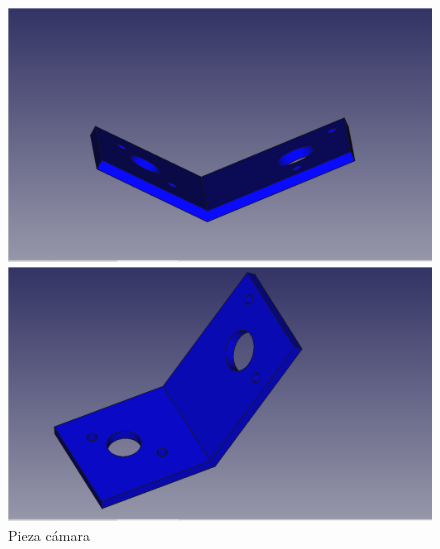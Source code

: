 \begin{figure}[ht!]
	\centering
	\begin{minipage}{0.45\linewidth}
		\centering
		\includegraphics[width=\linewidth]{figs/cap5/camera2sin.png}
		\caption*{\centering}
	\end{minipage}
	\hspace{1cm}
	\begin{minipage}{0.45\linewidth}
		\centering
		\includegraphics[width=\linewidth]{figs/cap5/camera3sin.png}
		\caption*{\centering}
	\end{minipage}
	
	\caption{Pieza cámara}
	\label{fig:pcamara}
\end{figure}


